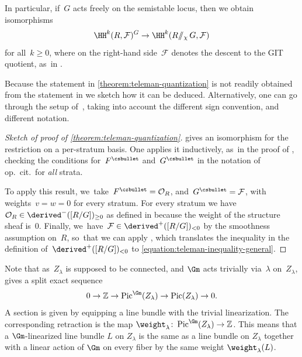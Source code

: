In particular, if~$G$ acts freely on the semistable locus,
then we obtain isomorphisms
\begin{equation*}
\HH^k(R,\mathcal{F})^G \to \HH^k(R{/\!\!/_\chi}\,G,\mathcal{F})
\end{equation*}
for all~$k\geq 0$,
where on the right-hand side~$\mathcal{F}$ denotes the descent to the GIT quotient, as~in \cite[Th.\,3.2]{MR1792291}.

Because the statement in \cref{theorem:teleman-quantization}
is not readily obtained from the statement in \cite[Th.\,3.29]{MR3327537}
we sketch how it can be deduced.
Alternatively,
one can go through the setup of~\cite[Prop.\,2.11]{MR1792291},
taking into account the different sign convention,
and different notation.
\begin{proof}[Sketch of proof of \cref{theorem:teleman-quantization}]
\cite[Th.\,3.29]{MR3327537} gives an isomorphism for the restriction
on a per-stratum basis.
One applies it inductively, as~in the proof of \cite[Th.\,1.1]{MR3327537},
checking the conditions for~$F^\csbullet$ and~$G^\csbullet$
in the notation of op.~cit.~for \emph{all} strata.

To apply this result, we~take~$F^\csbullet=\mathcal{O}_R$,
and~$G^\csbullet=\mathcal{F}$,
with weights~$v=w=0$ for every stratum.
For every stratum we have~$\mathcal{O}_R\in\derived^-([R/G])_{\geq 0}$
as defined in \cite[Def.\,3.24]{MR3327537}
because the weight of the structure sheaf is~0.
Finally, we~have~$\mathcal{F}\in\derived^+([R/G])_{<0}$
by the smoothness assumption on~$R$, so~that we can apply \cite[Lem.\,2.9]{MR3327537},
which translates the inequality
in the definition of~$\derived^+([R/G])_{<0}$
to \eqref{equation:teleman-inequality-general}.
\end{proof}

\begin{remark}
\label{remark:weights}
Note that as~$Z_\lambda$ is supposed to be connected,
and $\Gm$ acts trivially via~$\lambda$ on~$Z_\lambda$,
\cite[Prop.\,2.10]{MR3329192} gives a split exact sequence
\begin{equation*}
0 \to \mathbb{Z} \to \operatorname{Pic}^{\Gm}(Z_\lambda) \to \operatorname{Pic}(Z_\lambda) \to 0.
\end{equation*}
A section is given by equipping a line bundle with the trivial linearization.
The corresponding retraction is the map $\weight_\lambda\colon \operatorname{Pic}^{\Gm}(Z_\lambda) \to \mathbb{Z}$.
This means that a $\Gm$\nobreakdash-lin\-earized line bundle $L$ on $Z_\lambda$
is the same as a line bundle on $Z_\lambda$ together with
a linear action of $\Gm$ on every fiber by the same weight $\weight_\lambda(L)$.
\end{remark}


